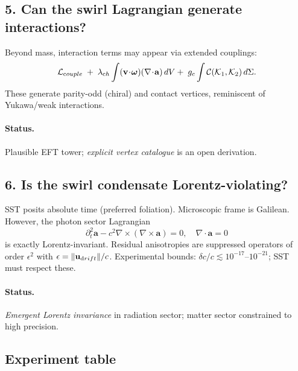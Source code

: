 \documentclass[11pt]{article}
\begin{document}
        \subsection*{5. Can the swirl Lagrangian generate interactions?}

        Beyond mass, interaction terms may appear via extended couplings:
        \[
            \mathcal L_{\textrm couple}\;+\;\lambda_{\textrm ch}\int (\mathbf v\!\cdot\!\boldsymbol\omega)(\nabla\!\cdot\!\mathbf a)\,dV
            +\;g_c \int \mathcal C(\mathcal K_1,\mathcal K_2)\,d\Sigma.
        \]
        These generate parity-odd (chiral) and contact vertices, reminiscent of Yukawa/weak interactions.

        \paragraph{Status.} Plausible EFT tower; \emph{explicit vertex catalogue} is an open derivation.

        \subsection*{6. Is the swirl condensate Lorentz-violating?}

        SST posits absolute time (preferred foliation). Microscopic frame is Galilean.
        However, the photon sector Lagrangian
        \[
            \partial_t^2 \mathbf a - c^2 \nabla\times(\nabla\times \mathbf a)=0,\quad \nabla\cdot\mathbf a=0
        \]
        is exactly Lorentz-invariant. Residual anisotropies are suppressed operators of order $\epsilon^2$ with $\epsilon=\|\mathbf u_{\textrm drift}\|/c$.
        Experimental bounds: $\delta c/c \lesssim 10^{-17}$--$10^{-21}$; SST must respect these.

        \paragraph{Status.} \emph{Emergent Lorentz invariance} in radiation sector; matter sector constrained to high precision.

        \subsection*{Experiment table}
\end{document}
